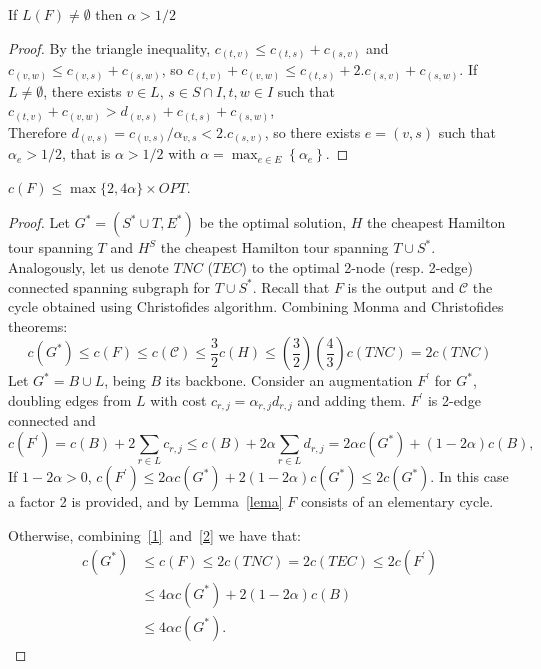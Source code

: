 \documentclass{endm}
\begin{document}
\clearpage

\begin{lem}\label{lema}
If $L(F) \neq \emptyset$ then $\alpha>1/2$
\end{lem}
\begin{proof}
By the triangle inequality, $c_{(t,v)}\leq c_{(t,s)}+c_{(s,v)}$ and
$c_{(v,w)}\leq c_{(v,s)}+c_{(s,w)}$, so
$c_{(t,v)}+c_{(v,w)} \leq c_{(t,s)}+2.c_{(s,v)}+ c_{(s,w)}$. If $L \neq \emptyset$, there exists $v \in L$, $s \in S \cap I, t,w \in I$ such that
$c_{(t,v)}+c_{(v,w)}>d_{(v,s)}+c_{(t,s)}+c_{(s,w)}$,\\ %
Therefore $d_{(v,s)} = c_{(v,s)}/\alpha_{v,s }< 2.c_{(s,v)}$, so there exists $e=(v,s)$ such that $\alpha_{e} > 1/2$, that is $\alpha > 1/2$ with $\alpha = \max_{e\in E} \left\{\alpha_{e} \right\}$.

\end{proof}
\begin{thm}
$c(F) \leq \max\{2,4 \alpha\}\times  OPT$.
\end{thm}

\begin{proof}
Let $G^*=(S^* \cup T,E^*)$ be the optimal solution, $H$ the cheapest Hamilton tour spanning $T$  and $H^S$ the cheapest Hamilton tour spanning $T\cup S^*$.
Analogously, let us denote $TNC$ ($TEC$) to the optimal 2-node (resp. 2-edge) connected spanning subgraph for $T\cup S^{*}$. Recall that $F$ is the output and $\mathcal{C}$ the cycle obtained
using Christofides algorithm. Combining Monma and Christofides theorems:
\begin{equation}\label{1}
c(G^{*}) \leq c(F) \leq c(\mathcal{C})\leq \frac{3}{2}c(H)
                   \leq \left(\frac{3}{2}\right) \left(\frac{4}{3}\right) c(TNC) = 2 c(TNC)
\end{equation}
Let $G^{*}=B \cup L$, being $B$ its backbone. Consider an augmentation $F^{\prime}$ for $G^{*}$, doubling edges from $L$
with cost $c_{r,j}=\alpha_{r,j} d_{r,j}$ and adding them. $F^{\prime}$ is 2-edge connected and
\begin{equation}\label{2}
c(F^{\prime}) = c(B)+2\sum_{r\in L}c_{r,j} \leq c(B)+2\alpha \sum_{r\in L}d_{r,j} =2 \alpha c(G^{*})+(1- 2 \alpha)c(B),
\end{equation}
\indent If $1-2 \alpha > 0$, $c(F^{\prime}) \leq 2 \alpha c(G^{*})+ 2(1-2 \alpha )c(G^{*})\leq 2 c(G^{*})$.
In this case a factor 2 is provided, and by Lemma~\ref{lema} $F$ consists of an elementary cycle.

\indent Otherwise, combining~\eqref{1}~and~\eqref{2} we have that:
\begin{align*}
  c(G^{*}) & \leq c(F) \leq 2 c(TNC) = 2 c(TEC) \leq 2 c(F^{\prime}) \\
           & \leq 4 \alpha c(G^{*})+ 2(1-2 \alpha)c(B)\\
           &\leq 4\alpha c(G^{*}).
\end{align*}
\end{proof}
\end{document}
